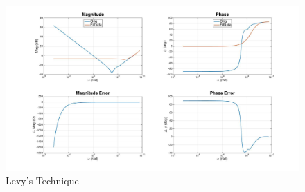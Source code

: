 \begin{figure}[ht!]
\ifisPPT
\noindent{}
\else
\includegraphics[keepaspectratio=true,width=6in]{./figures/regression/levy.jpg}
\fi
\centering
\caption{Levy's Technique}
\label{fig:levy}
\end{figure}

